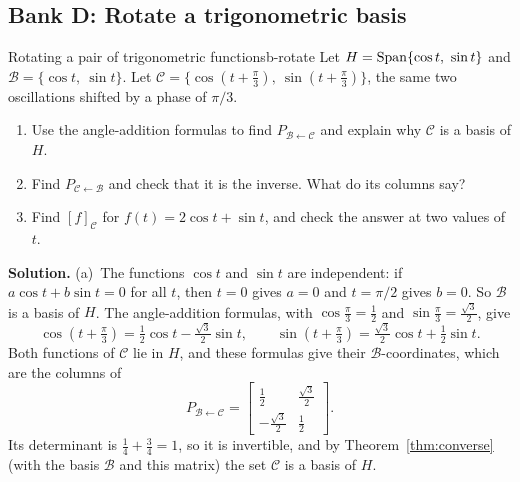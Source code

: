 \documentclass[11pt]{article}
\begin{document}
\subsection*{Bank D: Rotate a trigonometric basis}
\begin{exmp}{Rotating a pair of trigonometric functions}{b-rotate}
Let $H=\operatorname{Span}\{\cos t,\ \sin t\}$ and $\mathcal{B}=\{\cos t,\ \sin t\}$. Let $\mathcal{C}=\{\cos(t+\tfrac\pi3),\ \sin(t+\tfrac\pi3)\}$, the same two oscillations shifted by a phase of $\pi/3$.
\begin{enumerate}
  \item[(a)] Use the angle-addition formulas to find $P_{\mathcal{B}\leftarrow\mathcal{C}}$ and explain why $\mathcal{C}$ is a basis of $H$.
  \item[(b)] Find $P_{\mathcal{C}\leftarrow\mathcal{B}}$ and check that it is the inverse. What do its columns say?
  \item[(c)] Find $[f]_{\mathcal{C}}$ for $f(t)=2\cos t+\sin t$, and check the answer at two values of $t$.
\end{enumerate}

\textbf{Solution.}
(a)~The functions $\cos t$ and $\sin t$ are independent: if $a\cos t+b\sin t=0$ for all $t$, then $t=0$ gives $a=0$ and $t=\pi/2$ gives $b=0$. So $\mathcal{B}$ is a basis of $H$. The angle-addition formulas, with $\cos\tfrac\pi3=\tfrac12$ and $\sin\tfrac\pi3=\tfrac{\sqrt3}{2}$, give
\[
\cos(t+\tfrac\pi3)=\tfrac12\cos t-\tfrac{\sqrt3}{2}\sin t,\qquad \sin(t+\tfrac\pi3)=\tfrac{\sqrt3}{2}\cos t+\tfrac12\sin t.
\]
Both functions of $\mathcal{C}$ lie in $H$, and these formulas give their $\mathcal{B}$-coordinates, which are the columns of
\[
P_{\mathcal{B}\leftarrow\mathcal{C}}=\begin{bmatrix}\tfrac12&\tfrac{\sqrt3}{2}\\-\tfrac{\sqrt3}{2}&\tfrac12\end{bmatrix}.
\]
Its determinant is $\tfrac14+\tfrac34=1$, so it is invertible, and by Theorem~\ref{thm:converse} (with the basis $\mathcal{B}$ and this matrix) the set $\mathcal{C}$ is a basis of $H$.


\end{exmp}
\end{document}
